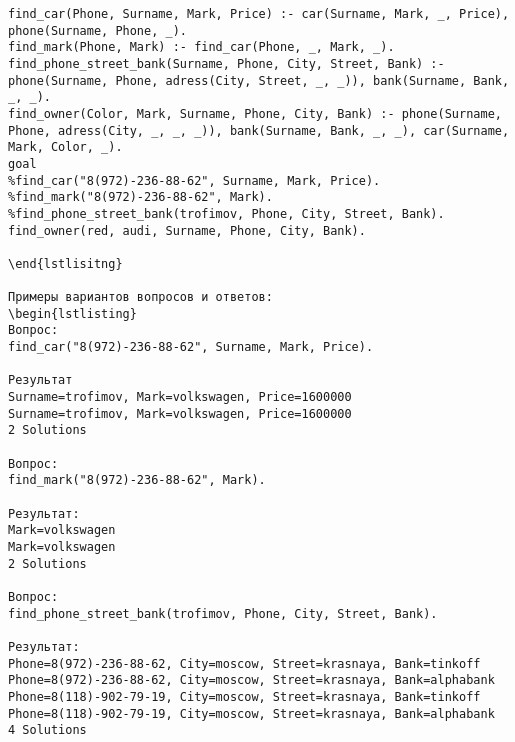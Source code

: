 \begin{lstlisting}
find_car(Phone, Surname, Mark, Price) :- car(Surname, Mark, _, Price), phone(Surname, Phone, _).
find_mark(Phone, Mark) :- find_car(Phone, _, Mark, _).
find_phone_street_bank(Surname, Phone, City, Street, Bank) :- phone(Surname, Phone, adress(City, Street, _, _)), bank(Surname, Bank, _, _).
find_owner(Color, Mark, Surname, Phone, City, Bank) :- phone(Surname, Phone, adress(City, _, _, _)), bank(Surname, Bank, _, _), car(Surname, Mark, Color, _).
goal	
%find_car("8(972)-236-88-62", Surname, Mark, Price).
%find_mark("8(972)-236-88-62", Mark).
%find_phone_street_bank(trofimov, Phone, City, Street, Bank).
find_owner(red, audi, Surname, Phone, City, Bank).

\end{lstlisitng}

Примеры вариантов вопросов и ответов:
\begin{lstlisting}
Вопрос:
find_car("8(972)-236-88-62", Surname, Mark, Price).

Результат
Surname=trofimov, Mark=volkswagen, Price=1600000
Surname=trofimov, Mark=volkswagen, Price=1600000
2 Solutions

Вопрос:
find_mark("8(972)-236-88-62", Mark).

Результат:
Mark=volkswagen
Mark=volkswagen
2 Solutions

Вопрос:
find_phone_street_bank(trofimov, Phone, City, Street, Bank).

Результат:
Phone=8(972)-236-88-62, City=moscow, Street=krasnaya, Bank=tinkoff
Phone=8(972)-236-88-62, City=moscow, Street=krasnaya, Bank=alphabank
Phone=8(118)-902-79-19, City=moscow, Street=krasnaya, Bank=tinkoff
Phone=8(118)-902-79-19, City=moscow, Street=krasnaya, Bank=alphabank
4 Solutions
\end{lstlisting}